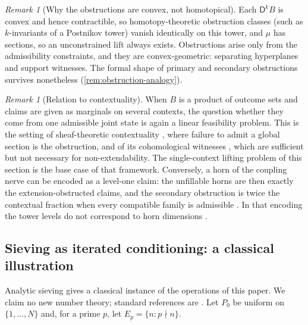 \documentclass[11pt]{article}
\theoremstyle{definition}
\theoremstyle{remark}
\newtheorem{remark}[theorem]{Remark}
\newcommand{\D}{\mathsf{D}}
\begin{document}
\begin{remark}[Why the obstructions are convex, not homotopical]
Each $\D^kB$ is convex and hence contractible, so homotopy-theoretic obstruction classes (such as
$k$-invariants of a Postnikov tower) vanish identically on this tower, and $\mu$ has sections, so an
unconstrained lift always exists. Obstructions arise only from the admissibility constraints, and they
are convex-geometric: separating hyperplanes and support witnesses. The formal shape of primary and
secondary obstructions survives nonetheless (\cref{rem:obstruction-analogy}).
\end{remark}

\begin{remark}[Relation to contextuality]
When $B$ is a product of outcome sets and claims are given as marginals on several contexts, the
question whether they come from one admissible joint state is again a linear feasibility problem.
This is the setting of sheaf-theoretic contextuality \cite{AbramskyBrandenburger2011}, where failure to
admit a global section is the obstruction, and of its cohomological witnesses
\cite{AbramskyMansfieldBarbosa2012}, which are sufficient but not necessary for non-extendability. The
single-context lifting problem of this section is the base case of that framework. Conversely, a horn of the coupling
nerve can be encoded as a level-one claim: the unfillable horns are then exactly the extension-obstructed claims, and the
secondary obstruction is twice the contextual fraction when every compatible family is admissible
\cite[Thm.~11.2]{Conditionals}. In that encoding the tower levels do not correspond to horn dimensions
\cite[Cor.~11.3]{Conditionals}.
\end{remark}

\subsection{Sieving as iterated conditioning: a classical illustration}\label{sec:sieve}

Analytic sieving gives a classical instance of the operations of this paper. We claim no new number
theory; standard references are \cite{FriedlanderIwaniec2010,Tenenbaum2015}. Let $P_0$ be uniform on
$\{1,\dots,N\}$ and, for a prime $p$, let $E_p=\{n:p\nmid n\}$.
\end{document}
